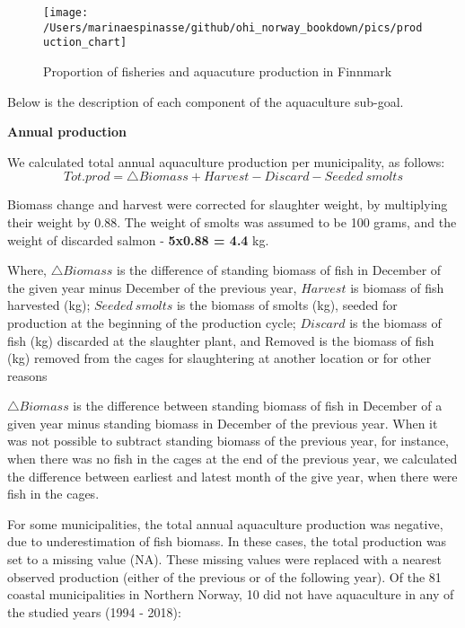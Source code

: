 \documentclass[
]{book}
\begin{document}
\begin{figure}

{\centering \texttt{[image: /Users/marinaespinasse/github/ohi\_norway\_bookdown/pics/production\_chart]} 

}

\caption{Proportion of fisheries and aquacuture production in Finnmark}\label{fig:akva-chart}
\end{figure}

Below is the description of each component of the aquaculture sub-goal.

\textbf{Annual production}

We calculated total annual aquaculture production per municipality, as follows:
\begin{equation}
Tot.prod = \triangle Biomass + Harvest - Discard - Seeded\ smolts
\label{eq:totprod} 
\end{equation}

Biomass change and harvest were corrected for slaughter weight, by multiplying their weight by 0.88.
The weight of smolts was assumed to be 100 grams, and the weight of discarded salmon - \textbf{5x0.88 = 4.4} kg.

Where, \(\triangle Biomass\) is the difference of standing biomass of fish in December of the given year minus December of the previous year, \(Harvest\) is biomass of fish harvested (kg); \(Seeded\ smolts\) is the biomass of smolts (kg), seeded for production at the beginning of the production cycle; \(Discard\) is the biomass of fish (kg) discarded at the slaughter plant, and Removed is the biomass of fish (kg) removed from the cages for slaughtering at another location or for other reasons

\(\triangle Biomass\) is the difference between standing biomass of fish in December of a given year minus standing biomass in December of the previous year. When it was not possible to subtract standing biomass of the previous year, for instance, when there was no fish in the cages at the end of the previous year, we calculated the difference between earliest and latest month of the give year, when there were fish in the cages.

For some municipalities, the total annual aquaculture production was negative, due to underestimation of fish biomass. In these cases, the total production was set to a missing value (NA). These missing values were replaced with a nearest observed production (either of the previous or of the following year).
Of the 81 coastal municipalities in Northern Norway, 10 did not have aquaculture in any of the studied years (1994 - 2018):
\end{document}
